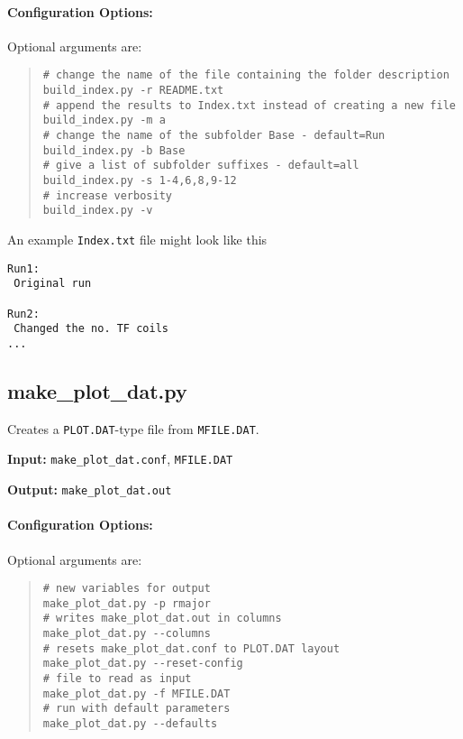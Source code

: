 \documentclass[11pt,a4paper]{report}
\newcommand{\mfile}{\mbox{\texttt{MFILE.DAT}}}
\newcommand{\plotdat}{\mbox{\texttt{PLOT.DAT}}}
\begin{document}
\paragraph{Configuration Options:}

Optional arguments are:
\begin{quote}
\begin{verbatim}
# change the name of the file containing the folder description
build_index.py -r README.txt 
# append the results to Index.txt instead of creating a new file
build_index.py -m a
# change the name of the subfolder Base - default=Run
build_index.py -b Base 
# give a list of subfolder suffixes - default=all
build_index.py -s 1-4,6,8,9-12 
# increase verbosity
build_index.py -v
\end{verbatim}
\end{quote}

An example \texttt{Index.txt} file might look like this
\begin{framed}
\begin{verbatim}
Run1:
 Original run

Run2:
 Changed the no. TF coils
...
\end{verbatim}
\end{framed}

\subsection{make\_plot\_dat.py}

Creates a \plotdat-type file from \mfile.

\begin{description}
\item{\textbf{Input:}}
\verb|make_plot_dat.conf|, \mfile\
                                
\item{\textbf{Output:}}
\verb|make_plot_dat.out|
\end{description}

\paragraph{Configuration Options:}

Optional arguments are:
\begin{quote} 
\begin{verbatim}
# new variables for output
make_plot_dat.py -p rmajor
# writes make_plot_dat.out in columns 
make_plot_dat.py --columns
# resets make_plot_dat.conf to PLOT.DAT layout
make_plot_dat.py --reset-config
# file to read as input
make_plot_dat.py -f MFILE.DAT 
# run with default parameters
make_plot_dat.py --defaults
\end{verbatim}
\end{quote}
\end{document}
